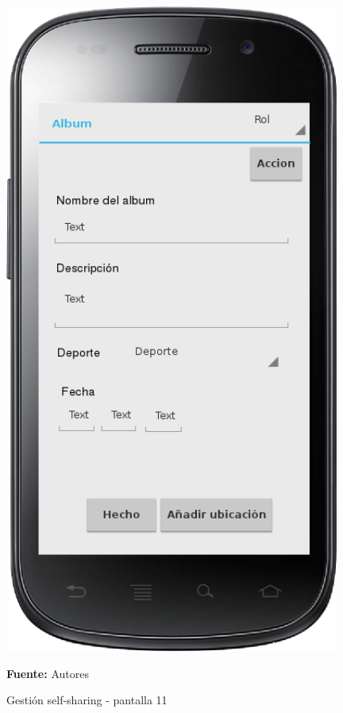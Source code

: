 \begin{figure}[!htb]
  \begin{center}
    \includegraphics[width=11cm]{./imagenes/UI/Self_sharing/self_sharing_11.png}
    \caption{Gestión self-sharing - pantalla 11}
    \label{fig:self_sharing_11}
    \textbf{Fuente:}  Autores
  \end{center}
\end{figure}

